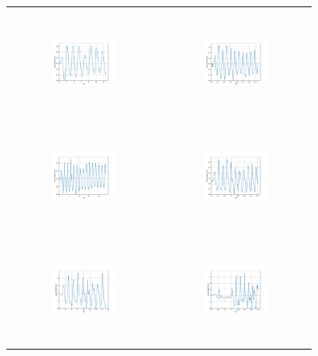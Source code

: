 \begin{figure}[H]
\begin{center}
\begin{tabular}{cc}
\includegraphics[width=0.45\textwidth, height=3.5cm]{graph/omega=1.50_A=1_wave.pdf}
&
\includegraphics[width=0.45\textwidth, height=3.5cm]{graph/omega=1.50_A=2_wave.pdf}\\
\includegraphics[width=0.45\textwidth, height=3.5cm]{graph/omega=1.50_A=3_wave.pdf}
&
\includegraphics[width=0.45\textwidth, height=3.5cm]{graph/omega=1.50_A=4_wave.pdf}\\
\includegraphics[width=0.45\textwidth, height=3.5cm]{graph/omega=1.50_A=5_wave.pdf}
&
\includegraphics[width=0.45\textwidth, height=3.5cm]{graph/omega=1.50_A=6_wave.pdf}\\

\end{tabular}
\end{center}
\end{figure}
